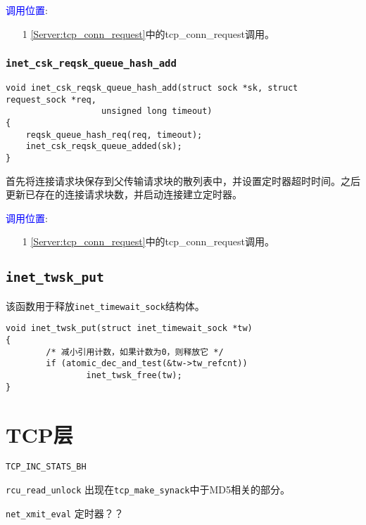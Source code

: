 		\textcolor{blue}{调用位置}:

			\begin{enumerate}
				\item[1]		\ref{Server:tcp_conn_request}中的tcp\_conn\_request调用。
			\end{enumerate}

		\subsubsection{\texttt{inet_csk_reqsk_queue_hash_add}}
			\label{INET:inet_csk_reqsk_queue_hash_add}
\begin{verbatim}
void inet_csk_reqsk_queue_hash_add(struct sock *sk, struct request_sock *req,
                   unsigned long timeout)
{
    reqsk_queue_hash_req(req, timeout);
    inet_csk_reqsk_queue_added(sk);
}
\end{verbatim}

        首先将连接请求块保存到父传输请求块的散列表中，并设置定时器超时时间。之后更新已存在的连接请求块数，并启动连接建立定时器。

		\textcolor{blue}{调用位置}:

			\begin{enumerate}
				\item[1]		\ref{Server:tcp_conn_request}中的tcp\_conn\_request调用。
			\end{enumerate}

	\subsection{\texttt{inet_twsk_put}}
该函数用于释放\texttt{inet_timewait_sock}结构体。
\begin{verbatim}
void inet_twsk_put(struct inet_timewait_sock *tw)
{
        /* 减小引用计数，如果计数为0，则释放它 */
        if (atomic_dec_and_test(&tw->tw_refcnt))
                inet_twsk_free(tw);
}
\end{verbatim}

\section{TCP层}

    \texttt{TCP_INC_STATS_BH}

    \texttt{rcu_read_unlock} 出现在\texttt{tcp_make_synack}中于MD5相关的部分。
    
    \texttt{net_xmit_eval}   定时器？？
